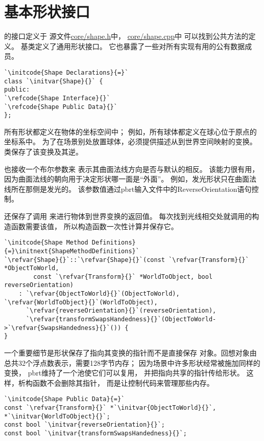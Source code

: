 \section{基本形状接口}\label{sec:基本形状接口}

的接口定义于
源文件\href{https://github.com/mmp/pbrt-v3/tree/master/src/core/shape.h}{\ttfamily core/shape.h}中，
\href{https://github.com/mmp/pbrt-v3/tree/master/src/core/shape.cpp}{\ttfamily core/shape.cpp}中
可以找到公共方法的定义。
基类定义了通用形状接口。
它也暴露了一些对所有实现有用的公有数据成员。
\begin{lstlisting}
`\initcode{Shape Declarations}{=}`
class `\initvar{Shape}{}` {
public:
`\refcode{Shape Interface}{}`
`\refcode{Shape Public Data}{}`
};
\end{lstlisting}

所有形状都定义在物体的坐标空间中；
例如，所有球体都定义在球心位于原点的坐标系中。
为了在场景别处放置球体，必须提供描述从到世界空间映射的变换。
类保存了该变换及其逆。

也接收一个布尔参数来
表示其曲面法线方向是否与默认的相反。
该能力很有用，因为曲面法线的朝向用于决定形状哪一面是“外面”。
例如，发光形状只在曲面法线所在那侧是发光的。
该参数值通过pbrt输入文件中的{\ttfamily ReverseOrientation}语句控制。

还保存了调用
来进行物体到世界变换的返回值。
每次找到光线相交处就调用的构造函数需要该值，
所以构造函数一次性计算并保存它。
\begin{lstlisting}
`\initcode{Shape Method Definitions}{=}\initnext{ShapeMethodDefinitions}`
`\refvar{Shape}{}`::`\refvar{Shape}{}`(const `\refvar{Transform}{}` *ObjectToWorld,
        const `\refvar{Transform}{}` *WorldToObject, bool reverseOrientation)
    : `\refvar{ObjectToWorld}{}`(ObjectToWorld), `\refvar{WorldToObject}{}`(WorldToObject),
      `\refvar{reverseOrientation}{}`(reverseOrientation),
      `\refvar{transformSwapsHandedness}{}`(ObjectToWorld->`\refvar{SwapsHandedness}{}`()) {
}
\end{lstlisting}

一个重要细节是形状保存了指向其变换的指针而不是直接保存
对象。回想对象由总共32个浮点数表示，需要128字节内存；
因为场景中许多形状经常被施加同样的变换，
pbrt维持了一个池使它们可以复用，
并把指向共享的指针传给形状。
这样，析构函数不会删除其指针，
而是让控制代码来管理那些内存。
\begin{lstlisting}
`\initcode{Shape Public Data}{=}`
const `\refvar{Transform}{}` *`\initvar{ObjectToWorld}{}`, *`\initvar{WorldToObject}{}`;
const bool `\initvar{reverseOrientation}{}`;
const bool `\initvar{transformSwapsHandedness}{}`;
\end{lstlisting}

